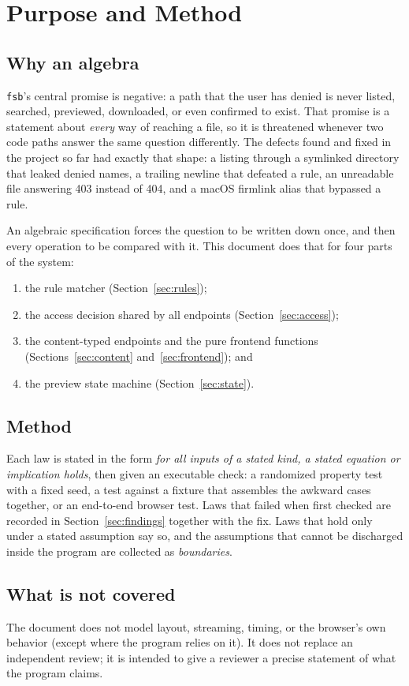 \section{Purpose and Method}

\subsection{Why an algebra}

\texttt{fsb}'s central promise is negative: a path that the user has denied is
never listed, searched, previewed, downloaded, or even confirmed to exist.  That
promise is a statement about \emph{every} way of reaching a file, so it is
threatened whenever two code paths answer the same question differently.  The
defects found and fixed in the project so far had exactly that shape: a listing
through a symlinked directory that leaked denied names, a trailing newline that
defeated a rule, an unreadable file answering 403 instead of 404, and a macOS
firmlink alias that bypassed a rule.

An algebraic specification forces the question to be written down once, and
then every operation to be compared with it.  This document does that for four
parts of the system:

\begin{enumerate}
  \item the rule matcher (Section~\ref{sec:rules});
  \item the access decision shared by all endpoints (Section~\ref{sec:access});
  \item the content-typed endpoints and the pure frontend functions
        (Sections~\ref{sec:content} and~\ref{sec:frontend}); and
  \item the preview state machine (Section~\ref{sec:state}).
\end{enumerate}

\subsection{Method}

Each law is stated in the form
\emph{for all inputs of a stated kind, a stated equation or implication holds},
then given an executable check: a randomized property test with a fixed seed, a
test against a fixture that assembles the awkward cases together, or an
end-to-end browser test.  Laws that failed when first checked are recorded in
Section~\ref{sec:findings} together with the fix.  Laws that hold only under a
stated assumption say so, and the assumptions that cannot be discharged inside
the program are collected as \emph{boundaries}.

\subsection{What is not covered}

The document does not model layout, streaming, timing, or the browser's own
behavior (except where the program relies on it).  It does not replace an
independent review; it is intended to give a reviewer a precise statement of
what the program claims.
